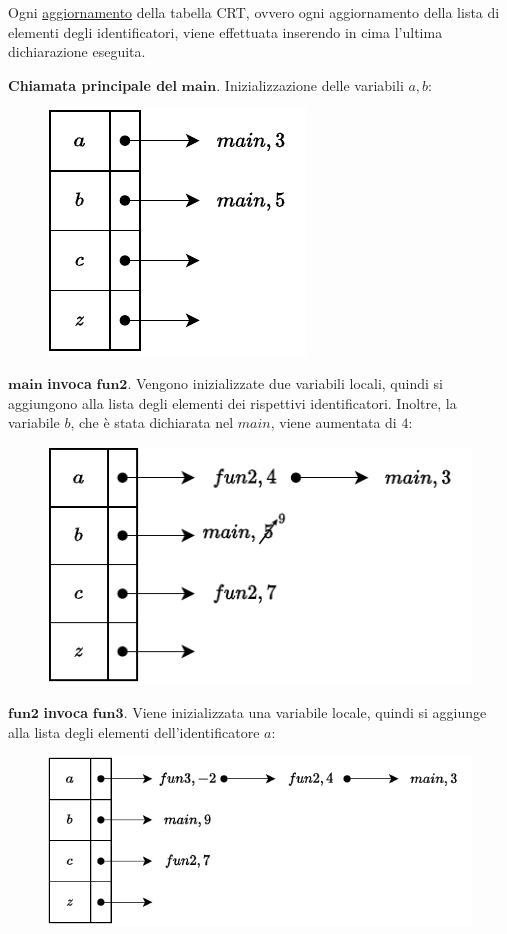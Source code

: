 \documentclass[a4paper]{article}
\begin{document}
	\noindent
	Ogni \underline{aggiornamento} della tabella CRT, ovvero ogni aggiornamento della lista di elementi degli identificatori, viene effettuata inserendo in cima l'ultima dichiarazione eseguita.\newline
	
	\noindent
	\textbf{Chiamata principale del }$\mathbf{main}$. Inizializzazione delle variabili $a,b$:
	\begin{figure}[!htp]
		\centering
		\includegraphics[width=.4\textwidth]{img/ex3-018.pdf}
	\end{figure}
	
	\noindent
	$\mathbf{main}$\textbf{ invoca }$\mathbf{fun2}$. Vengono inizializzate due variabili locali, quindi si aggiungono alla lista degli elementi dei rispettivi identificatori. Inoltre, la variabile $b$, che è stata dichiarata nel $main$, viene aumentata di $4$:
	\begin{figure}[!htp]
		\centering
		\includegraphics[width=.7\textwidth]{img/ex3-019.pdf}
	\end{figure}
	
	\noindent
	$\mathbf{fun2}$\textbf{ invoca }$\mathbf{fun3}$. Viene inizializzata una variabile locale, quindi si aggiunge alla lista degli elementi dell'identificatore $a$:
	\begin{figure}[!htp]
		\centering
		\includegraphics[width=.9\textwidth]{img/ex3-020.pdf}
	\end{figure}\newpage
	
\end{document}

